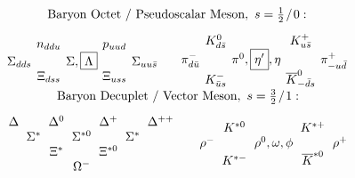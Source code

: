 \documentclass{article}
\newcommand{\hs}{\hspace{1pt}} %
\begin{document}
\begin{landscape}
\vspace{10pt}
\(  
    \begin{gathered}
        \text{Baryon Octet / Pseudoscalar Meson},\ s=\tfrac{1}{2} \hs / \hs 0: \\[5pt]
        \arraycolsep=2pt 
            \begin{array}{c c c c c}
                & n_{ddu} & & p_{uud} & \\
                \Sigma_{dds} & & \Sigma, \boxed{\Lambda} & & \Sigma_{uu\bar{s}}\\
                & \Xi_{dss} & & \Xi_{uss} &
            \end{array}
            \hspace{15pt}
            \begin{array}{c c c c c}
                & K^0_{d\bar{s}} & & K^+_{u\bar{s}} & \\
                \pi^-_{d\bar{u}} & & \pi^0,\boxed{\eta'},\eta & & \pi^+_{-u\bar{d}}\\
                & K^-_{\bar{u}s} & & \overline{K}^0_{-\bar{d}s} &
            \end{array}
    \end{gathered}
\)
\hspace{15pt}
\(
    \begin{gathered}
        \text{Baryon Decuplet / Vector Meson},\ s=\tfrac{3}{2} \hs /\hs 1: \\[5pt]
        \arraycolsep=3pt 
            \begin{array}{c c c c c c c}
                \Delta & & \Delta^0 & & \Delta^+ & & \Delta^{++} \\
                & \Sigma^* & & \Sigma^{*0} & & \Sigma^* & \\
                & & \Xi^* & & \Xi^{*0} & & \\
                & & & \Omega^- & & & \\
            \end{array}
            \hspace{15pt}
            \begin{array}{c c c c c}
                & K^{*0} & & K^{*+} & \\
                \rho^- & & \rho^0,\omega,\phi & & \rho^+\\
                & K^{*-} & & \overline{K}^{*0} &
            \end{array}  
    \end{gathered}
\)

\end{landscape}
\end{document}
